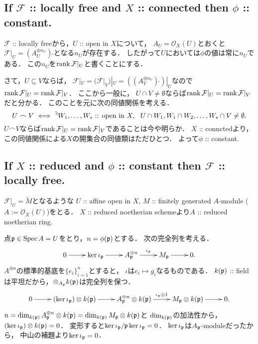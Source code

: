 \documentclass[a4paper]{jsarticle}
\newcommand{\shF}{\mathcal{F}}
\newcommand{\shO}{\mathcal{O}}
\newcommand{\OpenIn}{\text{ :: open in }}
\newcommand{\sidetilde}{\,\tilde{}}
\begin{document}
    \subsection{If $\shF$ :: locally free and $X$ :: connected then $\phi$ :: constant.}
    $\shF$ :: locally freeから，$U \OpenIn X$について，
    $A_U=\shO_X(U)$とおくと$\shF|_U=(A_U^{\oplus n_U})\sidetilde$となる$n_U$が存在する．
    したがって$U$においては$\phi$の値は常に$n_U$である．
    この$n_U$を$\rank \shF|_U$と書くことにする．

    さて，$U \subseteq V$ならば，
    $\shF|_U=(\shF|_V)|_U=((A_V^{\oplus n_V})\sidetilde)|_U$なので$\rank \shF|_U=\rank \shF|_V$．
    ここから一般に，
    $U \cap V \neq \emptyset$ならば$\rank \shF|_U=\rank \shF|_V$だと分かる．
    このことを元に次の同値関係を考える．
    \[ U \frown V \iff \Exists{W_1,\dots,W_s \OpenIn X} U \cap W_1, W_1 \cap W_2, \dots, W_s \cap V \neq \emptyset. \]
    $U \frown V$ならば$\rank \shF|_U=\rank \shF|_V$であることは今や明らか．
    $X$ :: connctedより，この同値関係による$X$の開集合の同値類はただひとつ．
    よって$\phi$ :: constant.

    \subsection{If $X$ :: reduced and $\phi$ :: constant then $\shF$ :: locally free.}
    $\shF|_U=\tilde{M}$となるような
    $U$ :: affine open in $X$, 
    $M$ :: finitely generated $A$-module ($A:=\shO_X(U)$)をとる．
    $X$ :: reduced noetherian schemeより$A$ :: reduced noetherian ring.
    
    点$\mathfrak{p} \in \operatorname{Spec} A=U$をとり，$n=\phi(\mathfrak{p})$とする．
    次の完全列を考える．
    \[
        \xymatrix
        {
            0 \ar[r]& \ker \iota_{\I{p}} \ar[r]& A_{\I{p}}^{\oplus n} \ar[r]^-{\iota_{\I{p}}}& M_{\I{p}} \ar[r]& 0.
        }
    \]
    $A^{\oplus n}$の標準的基底を$\{e_i\}_{i=1}^n$とすると，
    $\iota$は$e_i \mapsto g_i$なるものである．
    $k(\mathfrak{p})$ :: fieldは平坦だから，$\otimes_{A_{\mathfrak{p}}} k(\mathfrak{p})$は完全列を保つ．
    \[
        \xymatrix
        {
            0 \ar[r]
            & (\ker \iota_{\I{p}}) \otimes k(\I{p}) \ar[r]
            & A_{\I{p}}^{\oplus n}\otimes k(\I{p}) \ar[r]^-{\iota_{\I{p}} \otimes 1}
            & M_{\I{p}} \otimes k(\I{p}) \ar[r]& 0.
        }
    \]
    $n=\dim_{k(\mathfrak{p})} A_{\mathfrak{p}}^{\oplus n}\otimes k(\mathfrak{p})=\dim_{k(\mathfrak{p})} M_{\mathfrak{p}} \otimes k(\mathfrak{p})$と
    $\dim_{k(\mathfrak{p})}$の加法性から，
    $(\ker \iota_{\mathfrak{p}}) \otimes k(\mathfrak{p})=0$．
    変形すると$\ker \iota_{\mathfrak{p}}/\mathfrak{p}\ker \iota_{\mathfrak{p}}=0$．
    $\ker \iota_{\mathfrak{p}}$は$A_{\mathfrak{p}}$-moduleだったから，
    中山の補題より$\ker \iota_{\mathfrak{p}}=0$．
\end{document}
